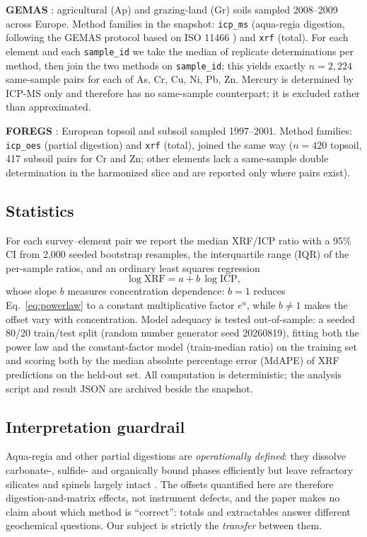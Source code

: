 \documentclass[11pt]{article}
\begin{document}
\textbf{GEMAS} \cite{reimann2014}: agricultural (Ap) and grazing-land (Gr)
soils sampled 2008--2009 across Europe. Method families in the snapshot:
\texttt{icp\_ms} (aqua-regia digestion, following the GEMAS protocol based
on ISO 11466 \cite{iso11466}) and \texttt{xrf} (total). For each element
and each \texttt{sample\_id} we take the median of replicate determinations
per method, then join the two methods on \texttt{sample\_id}; this yields
exactly $n{=}2{,}224$ same-sample pairs for each of As, Cr, Cu, Ni, Pb, Zn.
Mercury is determined by ICP-MS only and therefore has no same-sample
counterpart; it is excluded rather than approximated.

\textbf{FOREGS} \cite{salminen2005,devos2006}: European topsoil and subsoil
sampled 1997--2001. Method families: \texttt{icp\_oes} (partial digestion)
and \texttt{xrf} (total), joined the same way ($n{=}420$ topsoil, 417
subsoil pairs for Cr and Zn; other elements lack a same-sample double
determination in the harmonized slice and are reported only where pairs
exist).

\subsection{Statistics}
For each survey--element pair we report the median XRF/ICP ratio with a 95\%
CI from 2,000 seeded bootstrap resamples, the interquartile range (IQR) of
the per-sample ratios, and an ordinary least squares regression
\begin{equation}
\log \mathrm{XRF} = a + b \, \log \mathrm{ICP},
\label{eq:powerlaw}
\end{equation}
whose slope $b$ measures concentration dependence: $b{=}1$ reduces
Eq.~\ref{eq:powerlaw} to a constant multiplicative factor $e^{a}$, while
$b{\ne}1$ makes the offset vary with concentration. Model adequacy is
tested out-of-sample: a seeded 80/20 train/test split (random number
generator seed 20260819), fitting both the power law and the
constant-factor model (train-median ratio) on the training set and scoring
both by the median absolute percentage error (MdAPE) of XRF predictions on
the held-out set. All computation is deterministic; the analysis script and
result JSON are archived beside the snapshot.

\subsection{Interpretation guardrail}
Aqua-regia and other partial digestions are \emph{operationally defined}:
they dissolve carbonate-, sulfide- and organically bound phases efficiently
but leave refractory silicates and spinels largely intact
\cite{reimann2014,devos2006}. The offsets quantified here are therefore
digestion-and-matrix effects, not instrument defects, and the paper makes
no claim about which method is ``correct'': totals and extractables answer
different geochemical questions. Our subject is strictly the
\emph{transfer} between them.
\end{document}
